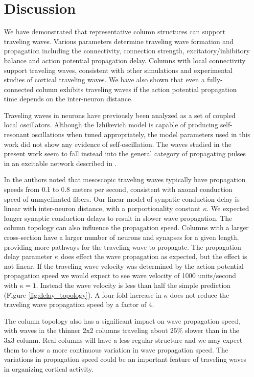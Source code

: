 \documentclass[a4paper,11pt]{article}
\begin{document}
\section{Discussion}
We have demonstrated that representative column structures can support traveling waves.
Various parameters determine traveling wave formation and propagation including the connectivity, connection strength, excitatory/inhibitory balance and action potential propagation delay.
Columns with local connectivity support traveling waves, consistent with other simulations and experimental studies of cortical traveling waves.
We have also shown that even a fully-connected column exhibits traveling waves if the action potential propagation time depends on the inter-neuron distance. 

Traveling waves in neurons have previously been analyzed as a set of coupled local oscillators.
Although the Izhikevich model is capable of producing self-resonant oscillations when tuned appropriately, the model parameters used in this work did not show any evidence of self-oscillation.
The waves studied in the present work seem to fall instead into the general category of propagating pulses in an excitable network described in \cite{ermentrout2001}. 

In \cite{muller2018} the authors noted that mesoscopic traveling waves typically have propagation speeds from 0.1 to 0.8 meters per second, consistent with axonal conduction speed of unmyelinated fibers.
Our linear model of synpatic conduction delay is linear with inter-neuron distance, with a porportionality constant $\kappa$.
We expected longer synaptic conduction delays to result in slower wave propagation.
The column topology can also influence the propagation speed.
Columns with a larger cross-section have a larger number of neurons and synapses for a given length, providing more pathways for the traveling wave to propagate.
The propagation delay parameter $\kappa$ does effect the wave propagation as expected, but the effect is not linear.
If the traveling wave velocity was determined by the action potential propagation speed we would expect to see wave velocity of 1000 units/second with $\kappa=1$.
Instead the wave velocity is less than half the simple prediction (Figure \ref{fig:delay_topology}).
A four-fold increase in $\kappa$ does not reduce the traveling wave propagation speed by a factor of 4. 

The column topology also has a significant impact on wave propagation speed, with waves in the thinner 2x2 columns traveling about $25\%$ slower than in the 3x3 column.
Real columns will have a less regular structure and we may expect them to show a more continuous variation in wave propagation speed. 
The variations in propagation speed could be an important feature of traveling waves in organizing cortical activity.
\end{document}
